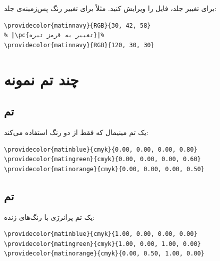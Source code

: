 برای تغییر جلد، فایل 
را ویرایش کنید. مثلاً برای تغییر رنگ
پس‌زمینه‌ی جلد:

\begin{latin}
\begin{verbatim}
\providecolor{matinnavy}{RGB}{30, 42, 58}
% |\pc{تغییر به قرمز تیره}|%
\providecolor{matinnavy}{RGB}{120, 30, 30}
\end{verbatim}
\end{latin}


\section{چند تم نمونه}
\label{sec:themes-examples}

\subsection{تم }
\label{sec:themes-minimal}

یک تم مینیمال که فقط از دو رنگ استفاده
می‌کند:

\begin{latin}
\begin{verbatim}
\providecolor{matinblue}{cmyk}{0.00, 0.00, 0.00, 0.80}
\providecolor{matingreen}{cmyk}{0.00, 0.00, 0.00, 0.60}
\providecolor{matinorange}{cmyk}{0.00, 0.00, 0.00, 0.50}
\end{verbatim}
\end{latin}


\subsection{تم }
\label{sec:themes-vibrant}

یک تم پرانرژی با رنگ‌های زنده:

\begin{latin}
\begin{verbatim}
\providecolor{matinblue}{cmyk}{1.00, 0.00, 0.00, 0.00}
\providecolor{matingreen}{cmyk}{1.00, 0.00, 1.00, 0.00}
\providecolor{matinorange}{cmyk}{0.00, 0.50, 1.00, 0.00}
\end{verbatim}
\end{latin}


